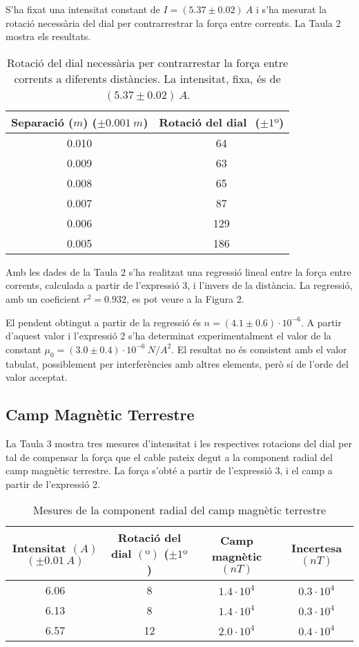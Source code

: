 \begin{multicols}{2}
	S'ha fixat una intensitat constant de $I=(5.37\pm0.02)\ \si{A}$ i s'ha mesurat la rotació necessària del dial per contrarrestrar la força entre corrents. La Taula 2 mostra els resultats.

	\begin{table}
		\centering
		\caption{Rotació del dial necessària per contrarrestar la força entre corrents a diferents distàncies. La intensitat, fixa, és de $(5.37\pm0.02)\ \si{A}$.}
		\vspace{0.5cm}
		\begin{tabular}{|c|c|}
			\hline
			\textbf{Separació ($\si{m}$) ($\pm 0.001\ \si{m}$)}&\textbf{Rotació del dial} $\si{}$ ($\pm 1º$) \\ \hline
			0.010 & 64  \\ \hline
			0.009 & 63  \\ \hline 
			0.008 & 65 \\ \hline 
			0.007 & 87  \\ \hline 
			0.006 & 129  \\ \hline  
			0.005 & 186  \\ \hline  
		\end{tabular}
	\end{table}
	Amb les dades de la Taula 2 s'ha realitzat una regressió lineal entre la força entre corrents, calculada a partir de l'expressió 3, i l'invers de la distància. La regressió, amb un coeficient $r^2=0.932$, es pot veure a la Figura 2.

	El pendent obtingut a partir de la regressió és $n=(4.1\pm0.6)\cdot10^{-6}$. A partir d'aquest valor i l'expressió 2 s'ha determinat experimentalment el valor de la constant $\mu_0=(3.0\pm0.4)\cdot10^{-6}\ \si{N/A^2}$. El resultat no és consistent amb el valor tabulat, possiblement per interferències amb altres elements, però sí de l'orde del valor acceptat.

	\subsection{Camp Magnètic Terrestre}
	La Taula 3 mostra tres mesures d'intensitat i les respectives rotacions del dial per tal de compensar la força que el cable pateix degut a la component radial del camp magnètic terrestre. La força s'obté a partir de l'expressió 3, i el camp a partir de l'expressió 2.

	\begin{table}
		\centering
		\caption{Mesures de la component radial del camp magnètic terrestre}
		\vspace{0.5cm}
		\begin{tabular}{|c|c|c|c|}
			\hline
			\textbf{Intensitat} $\si{(A)}$ $(\pm0.01\ \si{A})$&\textbf{Rotació del dial} $\si{(º)}$ ($\pm 1º$)&\textbf{Camp magnètic} $\si{(nT)}$ & \textbf{Incertesa} $\si{(nT)}$\\ \hline
			6.06 & 8 &$1.4\cdot10^{4}$ & $0.3\cdot10^{4}$ \\ \hline
			6.13 & 8  &$1.4\cdot10^{4}$  &$0.3\cdot10^{4}$ \\ \hline 
			6.57 & 12 &$2.0\cdot10^{4}$  &$0.4\cdot10^{4}$ \\ \hline 


\end{tabular}
\end{table}
\end{multicols}
